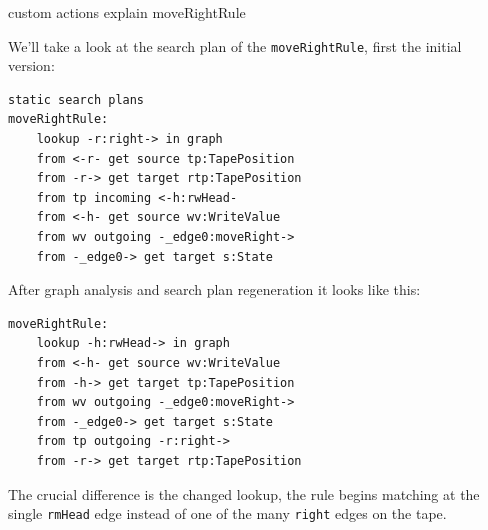 \begin{grshell}
custom actions explain moveRightRule
\end{grshell}

We'll take a look at the search plan of the \texttt{moveRightRule}, first the initial version:

\begin{verbatim}
static search plans
moveRightRule:
    lookup -r:right-> in graph
    from <-r- get source tp:TapePosition
    from -r-> get target rtp:TapePosition
    from tp incoming <-h:rwHead-
    from <-h- get source wv:WriteValue
    from wv outgoing -_edge0:moveRight->
    from -_edge0-> get target s:State
\end{verbatim}

After graph analysis and search plan regeneration it looks like this:

\begin{verbatim}
moveRightRule:
    lookup -h:rwHead-> in graph
    from <-h- get source wv:WriteValue
    from -h-> get target tp:TapePosition
    from wv outgoing -_edge0:moveRight->
    from -_edge0-> get target s:State
    from tp outgoing -r:right->
    from -r-> get target rtp:TapePosition
\end{verbatim}

The crucial difference is the changed lookup, the rule begins matching at the single \texttt{rmHead} edge instead of one of the many \texttt{right} edges on the tape.
